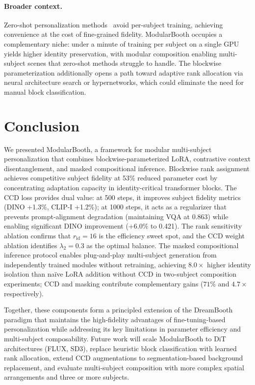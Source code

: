 \documentclass{article}
\begin{document}
\paragraph{Broader context.}
Zero-shot personalization methods~\citep{ye2023ipadapter} avoid per-subject training, achieving convenience at the cost of fine-grained fidelity.
ModularBooth occupies a complementary niche: under a minute of training per subject on a single GPU yields higher identity preservation, with modular composition enabling multi-subject scenes that zero-shot methods struggle to handle.
The blockwise parameterization additionally opens a path toward adaptive rank allocation via neural architecture search or hypernetworks, which could eliminate the need for manual block classification.

\section{Conclusion}
\label{sec:conclusion}

We presented ModularBooth, a framework for modular multi-subject personalization that combines blockwise-parameterized LoRA, contrastive context disentanglement, and masked compositional inference.
Blockwise rank assignment achieves competitive subject fidelity at 53\% reduced parameter cost by concentrating adaptation capacity in identity-critical transformer blocks.
The CCD loss provides dual value: at 500 steps, it improves subject fidelity metrics (DINO +1.3\%, CLIP-I +1.2\%); at 1000 steps, it acts as a regularizer that prevents prompt-alignment degradation (maintaining VQA at 0.863) while enabling significant DINO improvement (+6.0\% to 0.421).
The rank sensitivity ablation confirms that $r_{\text{id}}{=}16$ is the efficiency sweet spot, and the CCD weight ablation identifies $\lambda_2{=}0.3$ as the optimal balance.
The masked compositional inference protocol enables plug-and-play multi-subject generation from independently trained modules without retraining, achieving $8.0\times$ higher identity isolation than na\"ive LoRA addition without CCD in two-subject composition experiments; CCD and masking contribute complementary gains ($71\%$ and $4.7\times$ respectively).

Together, these components form a principled extension of the DreamBooth paradigm that maintains the high-fidelity advantages of fine-tuning-based personalization while addressing its key limitations in parameter efficiency and multi-subject composability.
Future work will scale ModularBooth to DiT architectures (FLUX, SD3), replace heuristic block classification with learned rank allocation, extend CCD augmentations to segmentation-based background replacement, and evaluate multi-subject composition with more complex spatial arrangements and three or more subjects.
\end{document}
